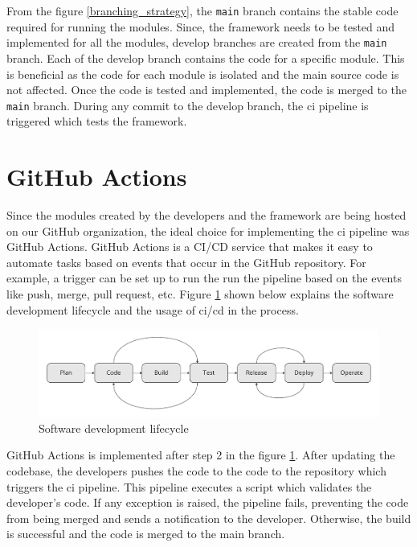 From the figure \ref{branching_strategy}, the \texttt{main} branch contains the stable code required for running the modules. Since, the framework needs to be
tested and implemented for all the modules, develop branches are created from the \texttt{main} branch. Each of the develop branch contains the code for a 
specific module. This is beneficial as the code for each module is isolated and the main source code is not affected. Once the code is tested and implemented, 
the code is merged to the \texttt{main} branch. During any commit to the develop branch, the \acrshort{ci} pipeline is triggered which tests the framework.

\section{GitHub Actions}
Since the modules created by the developers and the framework are being hosted on our GitHub organization, the ideal choice for implementing the \acrshort{ci} pipeline was GitHub Actions.
GitHub Actions is a CI/CD service that makes it easy to automate tasks based on events that occur in the GitHub repository\cite{9463074}. For example, a 
trigger can be set up to run the run the pipeline based on the events like push, merge, pull request, etc. Figure \ref{github_actions_flowchart} shown below
explains the software development lifecycle and the usage of \acrshort{ci}/\acrshort{cd} in the process.\newline
\begin{figure}[!ht]
    \centering
    \includegraphics[width=1\textwidth]{Images/github_actions_flowchart.pdf}
    \caption{Software development lifecycle}
    \label{github_actions_flowchart}
\end{figure}

GitHub Actions is implemented after step 2 in the figure \ref{github_actions_flowchart}. After updating the codebase, the developers pushes the code to the
code to the repository which triggers the \acrshort{ci} pipeline. This pipeline executes a script which validates the developer's code. If any exception is 
raised, the pipeline fails, preventing the code from being merged and sends a notification to the developer. Otherwise, the build is successful and the code 
is merged to the main branch.

